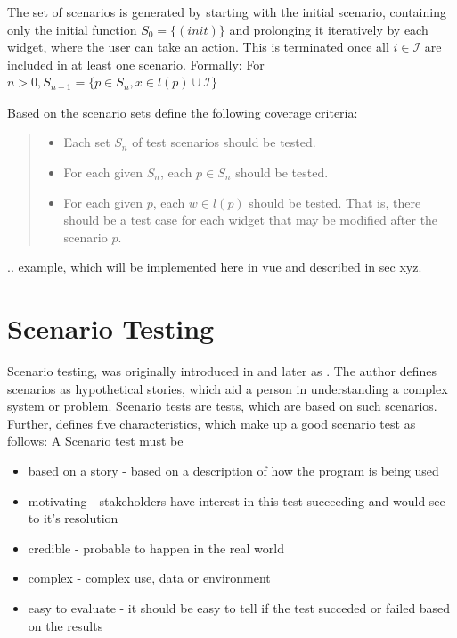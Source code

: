 The set of scenarios is generated by starting with the initial scenario, containing only the initial function $S_0 = \{(init)\}$ and prolonging it iteratively by each widget, where the user can take an action. This is terminated once all $i \in \mathcal{I}$ are included in at least one scenario. Formally: For $n > 0, S_{n+1}= \{p \in S_n, x \in l(p) \cup \mathcal{I}\}$ 

Based on the scenario sets \textcite{zhang2019scenario} define the following coverage criteria:
\begin{quote}
  

\begin{itemize}
  \item Each set $S_n$ of test scenarios should be tested.
  \item For each given $S_n$, each $p \in S_n$ should be tested.
  \item For each given $p$, each $w \in l(p)$ should be tested. That is, there should be a
  test case for each widget that may be modified after the scenario $p$.
\end{itemize} 
\end{quote}
.. example, which will be implemented here in vue and described in sec xyz. 


\section{Scenario Testing}
Scenario testing, was originally introduced in \textcite{kaner2003power} and later as \textcite{kaner2013introduction}. The author defines scenarios as hypothetical stories, which aid a person in understanding a complex system or problem. Scenario tests are tests, which are based on such scenarios.  \parencite[1]{kaner2013introduction}
Further, \parencite[2-5]{kaner2003power} defines five characteristics, which make up a good scenario test as follows:
A Scenario test must be
\begin{itemize}
     \item based on a story - based on a description of how the program is being used
    \item motivating - stakeholders have interest in this test succeeding and would see to it's resolution
    \item credible - probable to happen in the real world
    \item complex - complex use, data or environment
    \item easy to evaluate - it should be easy to tell if the test succeded or failed based on the results 
\end{itemize}

